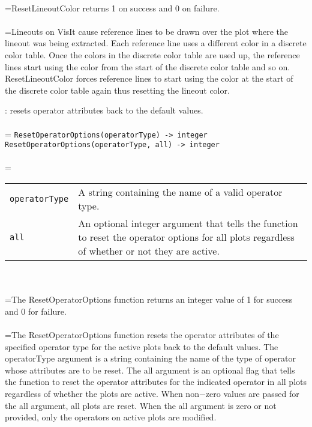 \documentclass[10pt,a4paper]{report}
\begin{document}
 \\ 
\hangindent=\parindent ResetLineoutColor returns 1 on success and 0 on failure. \\[-3mm] 

 \\ 
\hangindent=\parindent Lineouts on VisIt cause reference lines to be drawn over the plot where the lineout was being extracted. Each reference line uses a different color in a discrete color table. Once the colors in the discrete color table are used up, the reference lines start using the color from the start of the discrete color table and so on. ResetLineoutColor forces reference lines to start using the color at the start of the discrete color table again thus resetting the lineout color. \\[-3mm] 

\newpage


{}
: resets operator attributes back to the default values.\\[-3mm]

 \\ 
\hangindent=\parindent 
\verb!ResetOperatorOptions(operatorType) -> integer!\\ 
\verb!ResetOperatorOptions(operatorType, all) -> integer!\\ [-3mm]

 \\ 
\hangindent=\parindent 
\begin{tabular}{lp{9cm}}
\verb!operatorType! & A string containing the name of a valid operator type. \\
\verb!all! & An optional integer argument that tells the function to reset the operator options for all plots regardless of whether or not they are active. \\
\end{tabular} \\[-2mm]


 \\ 
\hangindent=\parindent The ResetOperatorOptions function returns an integer value of 1 for success and 0 for failure. \\[-3mm] 

 \\ 
\hangindent=\parindent The ResetOperatorOptions function resets the operator attributes of the specified operator type for the active plots back to the default values. The operatorType argument is a string containing the name of the type of operator whose attributes are to be reset. The all argument is an optional flag that tells the function to reset the operator attributes for the indicated operator in all plots regardless of whether the plots are active. When non$-$zero values are passed for the all argument, all plots are reset. When the all argument is zero or not provided, only the operators on active plots are modified. \\[-3mm] 
\end{document}
